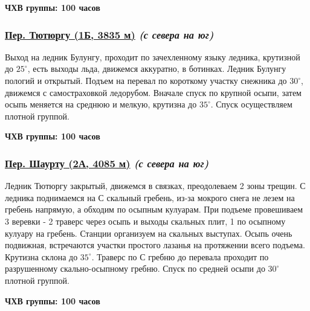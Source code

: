 			{\bf ЧХВ группы: 100 часов}

		\subsubsection*{%
			\hyperref[subsec:Day12]{Пер. Тютюргу (1Б, 3835 м)}
			{\it (с севера на юг)}%
		}
			Выход на ледник Булунгу, проходит по зачехленному языку ледника, крутизной до $25^\circ$, есть выходы
			льда, движемся аккуратно, в ботинках. Ледник Булунгу пологий и открытый. Подъем на перевал по короткому
			участку снежника до $30^\circ$, движемся с самостраховкой ледорубом. Вначале спуск по крупной осыпи,
			затем осыпь меняется на среднюю и мелкую, крутизна до $35^\circ$. Спуск осуществляем плотной группой.
		
			{\bf ЧХВ группы: 100 часов}

		\subsubsection*{%
			\hyperref[subsec:Day12]{Пер. Шаурту (2А, 4085 м)}
			{\it (с севера на юг)}%
		}
			Ледник Тютюргу закрытый, движемся в связках, преодолеваем 2 зоны трещин. С ледника поднимаемся на С
			скальный гребень, из-за мокрого снега не лезем на гребень напрямую, а обходим по осыпным кулуарам.
			При подъеме провешиваем 3 веревки - 2 траверс через осыпь и выходы скальных плит, 1 по осыпному кулуару
			на гребень. Станции организуем на скальных выступах. Осыпь очень подвижная, встречаются участки простого
			лазанья на протяжении всего подъема. Крутизна склона до $35^\circ$. Траверс по С гребню до перевала
			проходит по разрушенному скально-осыпному гребню. Спуск по средней осыпи до $30^\circ$ плотной группой.
		
			{\bf ЧХВ группы: 100 часов}

